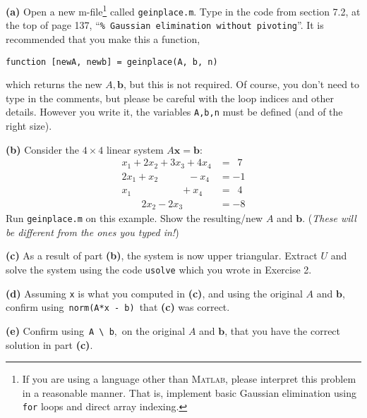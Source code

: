 \documentclass[12pt]{amsart}
\newcommand{\bb}{\mathbf{b}}
\newcommand{\bx}{\mathbf{x}}
\newcommand{\Matlab}{\textsc{Matlab}\xspace}
\newcommand{\epart}[1]{\medskip\noindent\textbf{(#1)}\quad }
\begin{document}
\epart{a}  Open a new m-file\footnote{If you are using a language other than \Matlab, please interpret this problem in a reasonable manner.  That is, implement basic Gaussian elimination using \texttt{for} loops and direct array indexing.} called \texttt{geinplace.m}.  Type in the code from section 7.2, at the top of page 137, ``\verb|% Gaussian elimination without pivoting|''.  It is recommended that you make this a function,

\verb|function [newA, newb] = geinplace(A, b, n)|

\noindent which returns the new $A,\bb$, but this is not required.  Of course, you don't need to type in the comments, but please be careful with the loop indices and other details.  However you write it, the variables \texttt{A,b,n} must be defined (and of the right size).

\epart{b} Consider the $4\times 4$ linear system $A\bx = \bb$:
\begin{align*}
x_1 + 2 x_2 + 3 x_3 + 4 x_4    &= \,\,\, 7 \\
2 x_1 + x_2 \quad \qquad - x_4 &= - 1 \\
x_1 \quad \qquad \qquad + x_4  &= \,\,\, 4 \\
\qquad 2 x_2 - 2 x_3 \qquad    &= - 8
\end{align*}
Run \texttt{geinplace.m} on this example.  Show the resulting/new $A$ and $\bb$.  (\emph{These will be different from the ones you typed in!})

\epart{c} As a result of part \textbf{(b)}, the system is now upper triangular.  Extract $U$ and solve the system using the code \texttt{usolve} which you wrote in Exercise 2.

\epart{d}  Assuming \verb|x| is what you computed in \textbf{(c)}, and using the original $A$ and $\bb$, confirm using  \,\verb|norm(A*x - b)|\, that \textbf{(c)} was correct.

\epart{e}  Confirm using \,\verb|A \ b|,\, on the original $A$ and $\bb$, that you have the correct solution in part \textbf{(c)}.
\end{document}
